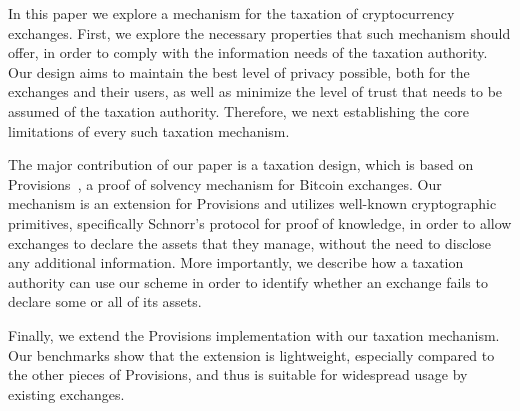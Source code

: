 In this paper we explore a mechanism for the taxation of cryptocurrency
exchanges. First, we explore the necessary properties that such mechanism
should offer, in order to comply with the information needs of the taxation
authority. Our design aims to maintain the best level of privacy possible, both
for the exchanges and their users, as well as minimize the level of trust that
needs to be assumed of the taxation authority. Therefore, we next establishing
the core limitations of every such taxation mechanism.

The major contribution of our paper is a taxation design, which is based on
Provisions~\cite{CCS:DBBCB15}, a proof of solvency mechanism for Bitcoin
exchanges. Our mechanism is an extension for Provisions and utilizes well-known
cryptographic primitives, specifically Schnorr's protocol for proof of
knowledge, in order to allow exchanges to declare the assets that they manage,
without the need to disclose any additional information. More importantly, we
describe how a taxation authority can use our scheme in order to identify
whether an exchange fails to declare some or all of its assets.

Finally, we extend the Provisions implementation with our taxation mechanism.
Our benchmarks show that the extension is lightweight, especially compared to
the other pieces of Provisions, and thus is suitable for widespread usage by
existing exchanges.
